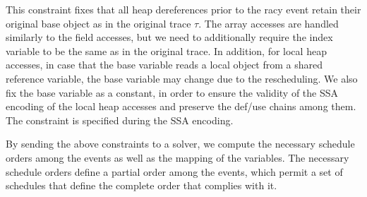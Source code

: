 This constraint fixes that all heap dereferences  prior to the racy event retain their original base object as in the original trace $\tau$. 
The array accesses are handled similarly to the field accesses, but we need to additionally require the index variable to be the same as in the original trace.
In addition, for local heap accesses, in case that the base variable reads a local object from a shared reference variable, the base variable may change due to the rescheduling. We also fix the base variable as a constant, in order to ensure the validity of the SSA encoding of the local heap accesses and preserve the def/use chains among them. The constraint is specified during the SSA encoding.




By sending the above constraints to a solver, we compute the necessary schedule orders among the events as well as the mapping of the variables. The necessary schedule orders define a partial order among the events, which permit a set of schedules that define the complete order that complies with it.


